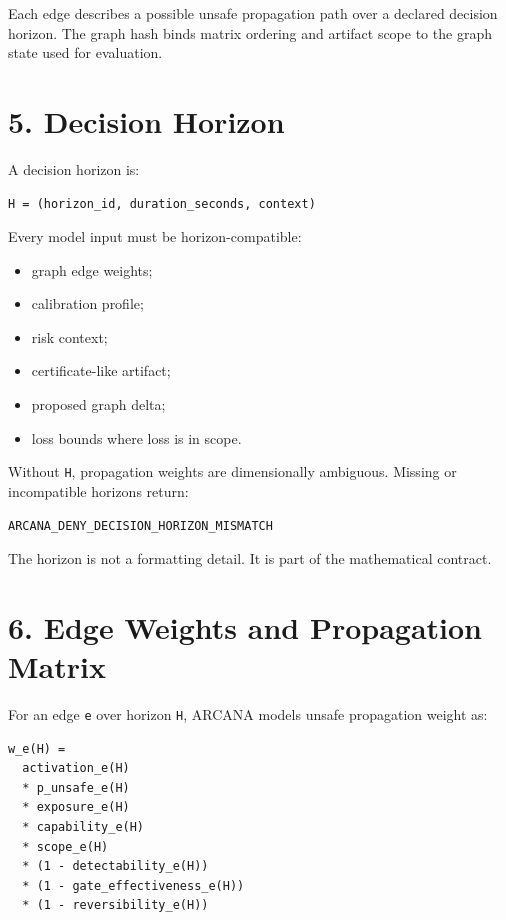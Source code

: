 \documentclass[
  american,
  a4paper,
  10pt]{article}
\providecommand{\tightlist}{%
  \setlength{\itemsep}{0pt}\setlength{\parskip}{0pt}}
\begin{document}
Each edge describes a possible unsafe propagation path over a declared decision horizon.
The graph hash binds matrix ordering and artifact scope to the graph state used for
evaluation.

\section{5. Decision Horizon}\label{5-decision-horizon}

A decision horizon is:

\begin{Verbatim}[breaklines=true,breakanywhere=true,fontsize=\small]
H = (horizon_id, duration_seconds, context)
\end{Verbatim}

Every model input must be horizon-compatible:

\begin{itemize}
\tightlist
\item
  graph edge weights;
\item
  calibration profile;
\item
  risk context;
\item
  certificate-like artifact;
\item
  proposed graph delta;
\item
  loss bounds where loss is in scope.
\end{itemize}

Without \texttt{H}, propagation weights are dimensionally ambiguous. Missing or
incompatible horizons return:

\begin{Verbatim}[breaklines=true,breakanywhere=true,fontsize=\small]
ARCANA_DENY_DECISION_HORIZON_MISMATCH
\end{Verbatim}

The horizon is not a formatting detail. It is part of the mathematical contract.

\section{6. Edge Weights and Propagation
Matrix}\label{6-edge-weights-and-propagation-matrix}

For an edge \texttt{e} over horizon \texttt{H}, ARCANA models unsafe propagation weight
as:

\begin{Verbatim}[breaklines=true,breakanywhere=true,fontsize=\small]
w_e(H) =
  activation_e(H)
  * p_unsafe_e(H)
  * exposure_e(H)
  * capability_e(H)
  * scope_e(H)
  * (1 - detectability_e(H))
  * (1 - gate_effectiveness_e(H))
  * (1 - reversibility_e(H))
\end{Verbatim}
\end{document}
